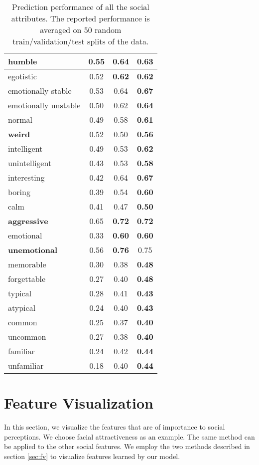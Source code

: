 \documentclass[10pt,twocolumn,letterpaper]{article}
\begin{document}
\begin{center}
\begin{table}[hbt]
{\begin{tabular}{|l||c|c|c|}
\hline
humble&0.55 & \textbf{0.64} & 0.63\\
\hline
egotistic&0.52 & \textbf{0.62} & \textbf{0.62}\\
\hline
emotionally stable&0.53 &0.64 & \textbf{0.67}\\
\hline
emotionally unstable&0.50 &0.62 & \textbf{0.64}\\
\hline
normal &0.49 & 0.58 & \textbf{0.61}\\
\hline
{\bf weird} & 0.52& 0.50 & \textbf{0.56} \\
\hline
intelligent&0.49 & 0.53& \textbf{0.62}\\
\hline
unintelligent&0.43 & 0.53 & \textbf{0.58}\\
\hline
interesting&0.42 & 0.64 & \textbf{0.67}\\
\hline
boring&0.39 & 0.54 & \textbf{0.60}\\
\hline
calm&0.41 & 0.47 & \textbf{0.50}\\ 
\hline
{\bf aggressive}&0.65 &\textbf{0.72} & \textbf{0.72}\\ 
\hline
emotional&0.33 &\textbf{0.60}& \textbf{0.60}\\
\hline
{\bf unemotional}&0.56 &\textbf{ 0.76} & 0.75\\
\hline
memorable&0.30 & 0.38 & \textbf{0.48}\\
\hline
forgettable&0.27 &0.40 &\textbf{ 0.48}\\
\hline
typical&0.28 & 0.41 & \textbf{0.43}\\
\hline
atypical&0.24 & 0.40 & \textbf{0.43}\\
\hline
common &0.25 & 0.37 & \textbf{0.40}\\
\hline
uncommon &0.27 & 0.38 & \textbf{0.40}\\
\hline
familiar&0.24 & 0.42 & \textbf{0.44}\\
\hline
unfamiliar&0.18 & 0.40 & \textbf{0.44}\\
\hline
\end{tabular}}
\caption{Prediction performance of all the social attributes. The reported performance is averaged on 50 random train/validation/test splits of the data.}
\label{tb:correlations}
\end{table}
\end{center}

\section{Feature Visualization} \label{viz}
In this section, we visualize the features that are of importance to social perceptions. We choose facial attractiveness as an example. The same method can be applied to the other social features. We employ the two methods described in section \ref{sec:fv} to visualize features learned by our model. 
\end{document}
